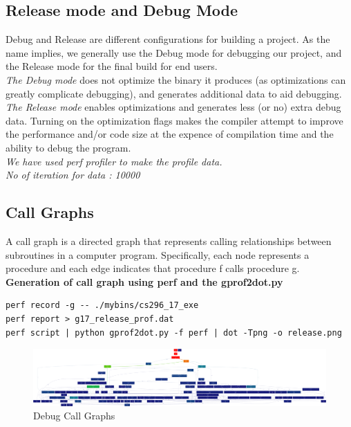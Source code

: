 \documentclass[11pt,]{article}
\begin{document}
\begin{singlespace}
\subsection{Release mode and Debug Mode}
Debug and Release are different configurations for building a project.
 As the name implies, we generally use the Debug mode for debugging our project,
  and the Release mode for the final build for end users.\\
 \emph{The Debug mode} does not optimize the binary it produces (as optimizations can greatly complicate debugging), 
 and generates additional data to aid debugging.\\
 \emph{The Release mode} enables optimizations and generates less (or no) extra debug data. Turning on the optimization flags makes the compiler 
 attempt to improve the performance and/or code size at the expence of compilation time and the ability to debug the program.\\
 
 \emph{We have used perf profiler to make the profile data.}\\
 \emph{No of iteration for data : 10000}

\subsection{Call Graphs}
A call graph is a directed graph that represents calling relationships between subroutines in a computer program.
Specifically, each node represents a procedure and each edge indicates that procedure f calls procedure g.\\

\textbf{Generation of call graph using perf and the gprof2dot.py} \\
\begin{lstlisting}
perf record -g -- ./mybins/cs296_17_exe
perf report > g17_release_prof.dat
perf script | python gprof2dot.py -f perf | dot -Tpng -o release.png
\end{lstlisting}

\begin{figure}[h!]
	\centering
	\caption{Debug Call Graphs}
		\includegraphics[width=1\textwidth]{debug.png}
\end{figure}


\end{singlespace}
\end{document}

